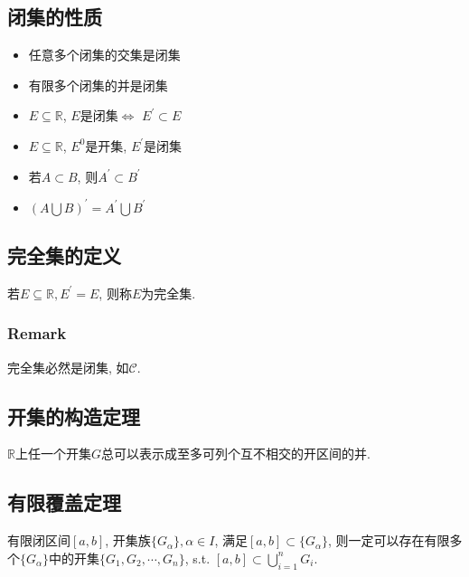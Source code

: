 \subsection{闭集的性质}
\begin{itemize}
    \item 任意多个闭集的交集是闭集
    \item 有限多个闭集的并是闭集
    \item $E \subseteq \mathbb{R}$, $E$是闭集$\iff$ $E^{'} \subset E$
    \item $E \subseteq \mathbb{R}$, $E^{0}$是开集, $E^{'}$是闭集
    \item 若$A \subset B$, 则$A^{'} \subset B^{'}$
    \item $(A \bigcup B)^{'} = A^{'} \bigcup B^{'}$
\end{itemize}
\subsection{完全集的定义}
若$E \subseteq \mathbb{R}, E^{'}=E$, 则称$E$为完全集. 
\subsubsection{Remark}
完全集必然是闭集, 如$\mathscr{C}$. 
\subsection{开集的构造定理}
$\mathbb{R}$上任一个开集$G$总可以表示成至多可列个互不相交的开区间的并. 
\subsection{有限覆盖定理}
有限闭区间$\left[a, b\right]$, 开集族$\{G_{\alpha}\}, \alpha \in I$, 满足$\left[a, b\right] \subset \{G_{\alpha}\}$, 则一定可以存在有限多个$\{G_{\alpha}\}$中的开集$\{G_1, G_2, \cdots, G_n\}$, s.t. $\left[a, b\right] \subset \bigcup ^{n} _{i = 1} G_i$. 
